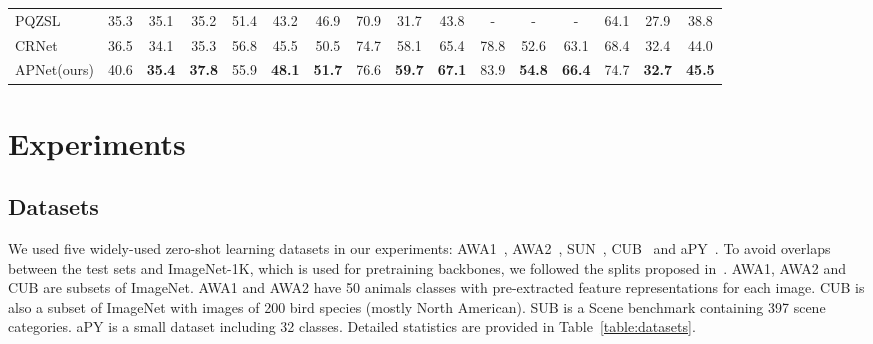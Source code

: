 \documentclass[letterpaper]{article} %
\def\Tabref#1{Table~\ref{#1}}
\begin{document}
\begin{table}[t!]
{\begin{tabular}{l|ccc|ccc|ccc|ccc|ccc}
PQZSL~\cite{Li2019CompressingUI} & 35.3 & 35.1 & 35.2 & 51.4 & 43.2 & 46.9 & 70.9 & 31.7 & 43.8 & - & - & - & 64.1 & 27.9 & 38.8 \\
CRNet~\cite{zhang2019co} & 36.5 & 34.1 & 35.3 &
56.8 & 45.5 & 50.5 & 74.7 & 58.1 & 65.4 & 78.8 & 52.6 & 63.1 & 68.4 & 32.4 & 44.0 \\
\midrule
APNet(ours) & 40.6 & \textbf{35.4} & \textbf{37.8} & 55.9 & \textbf{48.1} & \textbf{51.7} & 76.6 & \textbf{59.7} & \textbf{67.1} & 83.9 & \textbf{54.8} & \textbf{66.4} & 74.7 & \textbf{32.7} & \textbf{45.5} \\
\bottomrule
\end{tabular}
}
\label{table:results-gzs}
\end{table}





\section{Experiments}

\subsection{Datasets}\label{sec:dataset}
We used five widely-used zero-shot learning datasets in our experiments: AWA1~\cite{lampert2013attribute}, AWA2~\cite{xian2018zero}, SUN~\cite{sun-database}, CUB~\cite{welinder2010caltech} and aPY~\cite{farhadi2009describing}.
To avoid overlaps between the test sets and ImageNet-1K, which is used for pretraining backbones, we followed the splits proposed in~\cite{xian2018zero}. AWA1, AWA2 and CUB are subsets of ImageNet.
AWA1 and AWA2 have 50 animals classes with pre-extracted feature representations for each image. CUB is also a subset of ImageNet with images of 200 bird species (mostly North American). SUB is a Scene benchmark containing 397 scene categories. aPY is a small dataset including 32 classes. Detailed statistics are provided in \Tabref{table:datasets}.
\end{document}
